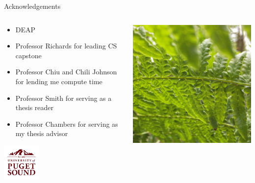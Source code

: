 \appendix

\begin{frame}{Acknowledgements}
\begin{columns}
\begin{column}{0.6\textwidth}
\begin{itemize}
\item DEAP \cite{Fortin2012DEAP:Easy}
\item Professor Richards for leading CS capstone
\item Professor Chiu and Chili Johnson for lending me compute time
\item Professor Smith for serving as a thesis reader
\item Professor Chambers for serving as my thesis advisor
\end{itemize}
	\vspace{-1ex}
	\begin{center}{
    \includegraphics[width= 0.3\textwidth]{img/UofPS_stacked_maroonRGB_PNG}}
    \end{center}

\end{column}
\begin{column}{0.4\textwidth}
\begin{center}
\includegraphics[width=\textwidth,trim={16cm 0 21cm 0},clip]{img/forest_fern}
\end{center}
\end{column}
\end{columns}

\end{frame}

